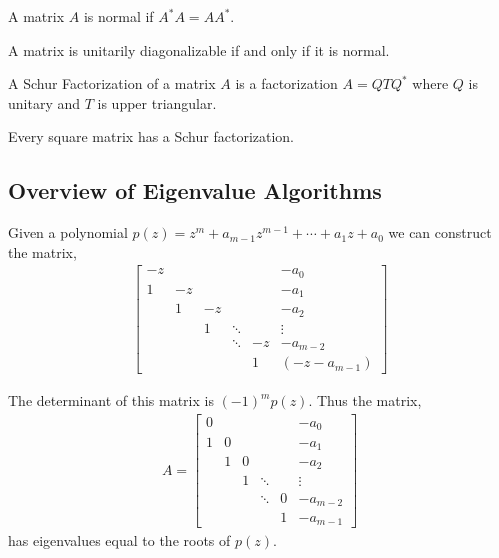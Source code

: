 \documentclass[12pt]{article}
\begin{document}
\begin{definition}
A matrix \( A \) is normal if \( A^*A = AA^* \).
\end{definition}

\begin{theorem}
A matrix is unitarily diagonalizable if and only if it is normal.
\end{theorem}

\begin{definition}
A Schur Factorization of a matrix \( A \) is a factorization \( A=QTQ^* \) where \( Q \) is unitary and \( T \) is upper triangular.
\end{definition}

\begin{theorem}
Every square matrix has a Schur factorization.
\end{theorem}


\subsection{Overview of Eigenvalue Algorithms}

Given a polynomial \( p(z) = z^m + a_{m-1} z^{m-1} + \cdots +a_1z + a_0 \) we can construct the matrix,
\begin{align*}
    \left[\begin{array}{cccccc}
    -z & & & & & -a_0 \\
     1 & -z & & & & -a_1 \\
     & 1 & -z & & & -a_2 \\
     & & 1 & \ddots & & \vdots \\
     & & & \ddots & -z & -a_{m-2} \\
     & & & & 1 & (-z-a_{m-1})
    \end{array}\right]
\end{align*}

The determinant of this matrix is \( (-1)^m p(z) \). Thus the matrix,
\begin{align*}
    A =     \left[\begin{array}{cccccc}
         0 & & & & & -a_0 \\
         1 & 0 & & & & -a_1 \\
         & 1 & 0 & & & -a_2 \\
         & & 1 & \ddots & & \vdots \\
         & & & \ddots & 0 & -a_{m-2} \\
         & & & & 1 & -a_{m-1}
        \end{array}\right]
\end{align*}
has eigenvalues equal to the roots of \( p(z) \).
\end{document}
